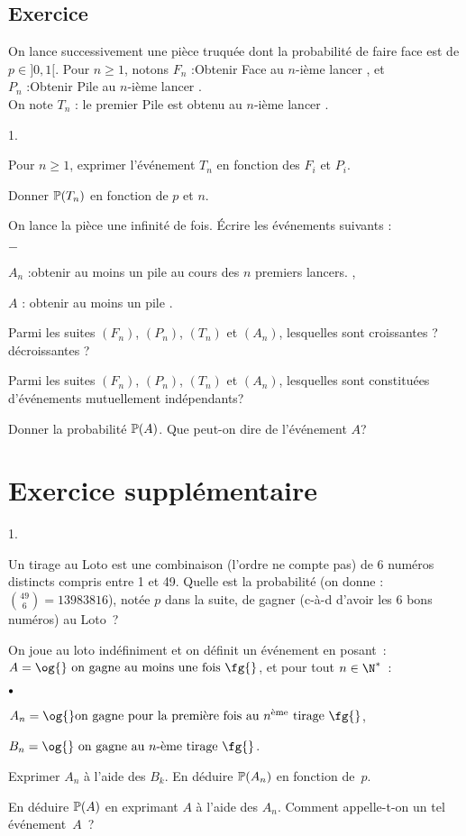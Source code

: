 \documentclass[11pt]{article}%
\begin{document}
\subsection*{Exercice}
\noindent
On lance successivement une pièce truquée dont la probabilité de faire 
face est de $p \in ]0,1[$. Pour $n \geq 1$, notons $F_n$ :\og Obtenir 
Face au $n$-ième lancer \fg{}, et\\
$P_n$ :\og Obtenir Pile au $n$-ième lancer \fg{}.\\
On note $T_n$ : \og le premier Pile est obtenu au $n$-ième lancer \fg{}.
 \begin{noliste}{1.}
\item Pour $n \geq 1$, exprimer l'événement $T_n$ en fonction des $F_i$ 
et $P_i$.
\item Donner $\mathbb{P}(T_n)$ en fonction de $p$ et $n$.
\item On lance la pièce une infinité de fois. \'Ecrire les événements 
suivants :
 \begin{noliste}{$-$}
  \item $A_n$ :\og obtenir au moins un pile au cours des $n$ premiers 
lancers. \fg{},
  \item $A$ : \og obtenir au moins un pile \fg{}.
 \end{noliste}
 \item Parmi les suites $(F_n)$, $(P_n)$, $(T_n)$ et $(A_n)$, 
lesquelles sont croissantes ?\\ décroissantes ?
 \item Parmi les suites $(F_n)$, $(P_n)$, $(T_n)$ et $(A_n)$, 
lesquelles sont constituées d'événements mutuellement indépendants?
 \item Donner la probabilité $\mathbb{P}(A)$. Que peut-on dire de 
l'événement $A$?
\end{noliste}


\section*{Exercice supplémentaire}
\begin{noliste}{1.}
\item Un tirage au Loto est une combinaison (l'ordre ne compte pas) de 
6 numéros distincts compris entre 1 et 49. Quelle est la probabilité 
(on donne : ${49\choose 6}=13 983 816$), notée $p$ dans la suite, de 
gagner (c-à-d d'avoir les 6 bons numéros) au Loto~?
\item On joue au loto indéfiniment et on définit un événement en 
posant~:
$A=\text{\og{} on gagne au moins une fois 
\fg{}}$, et  pour tout $n\in\N^*$~:
\begin{noliste}{$\scriptstyle \bullet$}
\item $A_n=\text{\og{}on gagne pour la premi\`ere fois au $\eme{n}$ 
tirage \fg{}}$,

\item $B_n=\text{\og{} on gagne au $n$-\`eme tirage \fg{}}$.
\end{noliste}
Exprimer $A_n$ à l'aide des $B_k$. En déduire $\mathbb{P}(A_n)$ en fonction 
de~$p$.
\item En déduire $\mathbb{P}(A)$ en exprimant $A$ à l'aide des $A_n$. 
Comment appelle-t-on un tel événement~$A$~?
\end{noliste}
\end{document}
